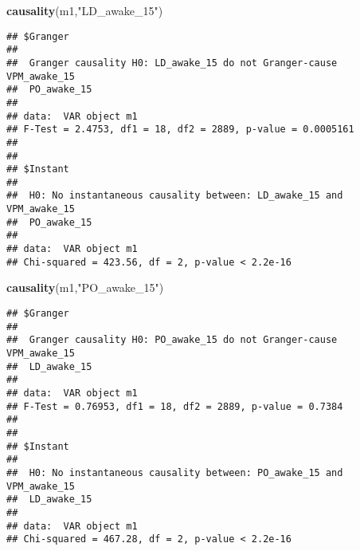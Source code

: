 \documentclass[
]{article}
\newenvironment{Shaded}{\begin{snugshade}}{\end{snugshade}}
\newcommand{\FunctionTok}[1]{\textcolor[rgb]{0.13,0.29,0.53}{\textbf{#1}}}
\newcommand{\NormalTok}[1]{#1}
\newcommand{\StringTok}[1]{\textcolor[rgb]{0.31,0.60,0.02}{#1}}
\begin{document}
\begin{Shaded}
\begin{Highlighting}[]
\FunctionTok{causality}\NormalTok{(m1,}\StringTok{"LD\_awake\_15"}\NormalTok{)}
\end{Highlighting}
\end{Shaded}

\begin{verbatim}
## $Granger
## 
##  Granger causality H0: LD_awake_15 do not Granger-cause VPM_awake_15
##  PO_awake_15
## 
## data:  VAR object m1
## F-Test = 2.4753, df1 = 18, df2 = 2889, p-value = 0.0005161
## 
## 
## $Instant
## 
##  H0: No instantaneous causality between: LD_awake_15 and VPM_awake_15
##  PO_awake_15
## 
## data:  VAR object m1
## Chi-squared = 423.56, df = 2, p-value < 2.2e-16
\end{verbatim}

\begin{Shaded}
\begin{Highlighting}[]
\FunctionTok{causality}\NormalTok{(m1,}\StringTok{"PO\_awake\_15"}\NormalTok{)}
\end{Highlighting}
\end{Shaded}

\begin{verbatim}
## $Granger
## 
##  Granger causality H0: PO_awake_15 do not Granger-cause VPM_awake_15
##  LD_awake_15
## 
## data:  VAR object m1
## F-Test = 0.76953, df1 = 18, df2 = 2889, p-value = 0.7384
## 
## 
## $Instant
## 
##  H0: No instantaneous causality between: PO_awake_15 and VPM_awake_15
##  LD_awake_15
## 
## data:  VAR object m1
## Chi-squared = 467.28, df = 2, p-value < 2.2e-16
\end{verbatim}
\end{document}
